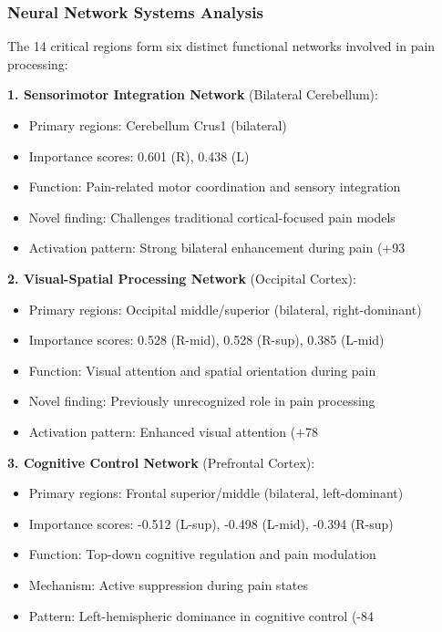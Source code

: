 \documentclass[10pt,journal,compsoc]{IEEEtran}
\begin{document}
\subsubsection{Neural Network Systems Analysis}

The 14 critical regions form six distinct functional networks involved in pain processing:

\textbf{1. Sensorimotor Integration Network} (Bilateral Cerebellum):
\begin{itemize}
\item Primary regions: Cerebellum Crus1 (bilateral)
\item Importance scores: 0.601 (R), 0.438 (L)
\item Function: Pain-related motor coordination and sensory integration
\item Novel finding: Challenges traditional cortical-focused pain models
\item Activation pattern: Strong bilateral enhancement during pain (+93%
\end{itemize}

\textbf{2. Visual-Spatial Processing Network} (Occipital Cortex):
\begin{itemize}
\item Primary regions: Occipital middle/superior (bilateral, right-dominant)
\item Importance scores: 0.528 (R-mid), 0.528 (R-sup), 0.385 (L-mid)
\item Function: Visual attention and spatial orientation during pain
\item Novel finding: Previously unrecognized role in pain processing
\item Activation pattern: Enhanced visual attention (+78%
\end{itemize}

\textbf{3. Cognitive Control Network} (Prefrontal Cortex):
\begin{itemize}
\item Primary regions: Frontal superior/middle (bilateral, left-dominant)
\item Importance scores: -0.512 (L-sup), -0.498 (L-mid), -0.394 (R-sup)
\item Function: Top-down cognitive regulation and pain modulation
\item Mechanism: Active suppression during pain states
\item Pattern: Left-hemispheric dominance in cognitive control (-84%
\end{itemize}
\end{document}
